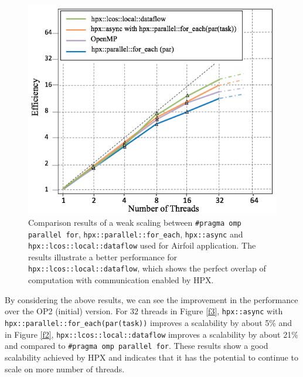 \documentclass[conference]{IEEEtran}
\begin{document}
\begin{figure} 
\begin{center}
\centering
\includegraphics[width=1\columnwidth]{Pictures/weak.jpg}
\caption {\small{Comparison results of a weak scaling between \texttt{\#pragma omp parallel for}, \texttt{hpx::parallel::for\_each}, \texttt{hpx::async} and \texttt{hpx::lcos::local::dataflow} used for Airfoil application. The results illustrate a better performance for \texttt{hpx::lcos::local::dataflow}, which shows
the perfect overlap of computation with communication enabled by HPX.}}
\label{f5}
\end{center}
\end{figure}



By considering the above results, we can see the improvement in the performance over the OP2 (initial) version. For $32$ threads in Figure \ref{f3}, \texttt{hpx::async} with \texttt{hpx::parallel::for\_each(par(task))} improves a scalability by about 5\% and in Figure \ref{f2}, \texttt{hpx::lcos::local::dataflow} improves a scalability by about 21\% and compared to \texttt{\#pragma omp parallel for}. These results show a good scalability achieved by HPX and indicates that it has the potential to continue to scale on more number of threads.
\end{document}
